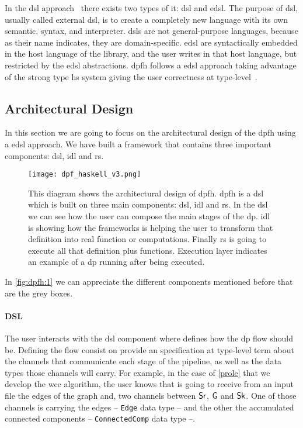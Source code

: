 In the \acrlong{dsl} approach~\cite{dsl} there exists two types of it: \acrfull{dsl} and \acrfull{edsl}. The purpose of \acrshort{dsl}, usually called external \acrshort{dsl}, is to create a completely new language with its own semantic, syntax, and interpreter. 
\acrshort{dsl}s are not general-purpose languages, because as their name indicates, they are domain-specific. \acrshort{edsl} are syntactically embedded in the host language of the library, and the user writes in that host language, but restricted by the \acrshort{edsl} abstractions.
\acrshort{dpfh} follows a \acrshort{edsl} approach taking advantage of the strong type \acrshort{hs} system giving the user correctness at type-level~\cite{curryhoward}.

\subsection{Architectural Design}
In this section we are going to focus on the architectural design of the \acrshort{dpfh} using a \acrshort{edsl} approach. We have built a framework that contains
three important components: \acrshort{dsl}, \acrshort{idl} and \acrshort{rs}. 

\begin{figure}[!ht]
  \centering
   \texttt{[image: dpf\_haskell\_v3.png]}
    \caption[{[\acrshort{dpfh}] Architectural design of \acrshort{dpfh}}]{This diagram shows the architectural design of \acrshort{dpfh}. \acrshort{dpfh} is a \acrshort{dsl} which is built on three main components: \acrshort{dsl}, \acrshort{idl} and \acrshort{rs}. In the \acrshort{dsl} we can see how the user can compose the main stages of the \acrshort{dp}. \acrshort{idl} is showing how the frameworks is helping the user to transform that definition into real function or computations. Finally \acrshort{rs} is going to execute all that definition plus functions. Execution layer indicates an example of a \acrshort{dp} running after being executed.}
    \label{fig:dpfh:1}
\end{figure}

In \autoref{fig:dpfh:1} we can appreciate the different components mentioned before that are the grey boxes.

\paragraph{DSL} The user interacts with the \acrshort{dsl} component where defines how the \acrshort{dp} flow
should be. Defining the flow consist on provide an specification at type-level term about the channels that communicate each stage of the pipeline, as well as the data types those channels will carry. 
For example, in the case of \autoref{prole} that we develop the \acrshort{wcc} algorithm, the user knows that is going to receive from an input file 
the edges of the graph and, two channels between $\mathsf{Sr}$, $\mathsf{G}$ and $\mathsf{Sk}$. One of those channels is carrying the edges -- \texttt{Edge} data type -- and the other the accumulated connected components -- \texttt{ConnectedComp} data type --. 

